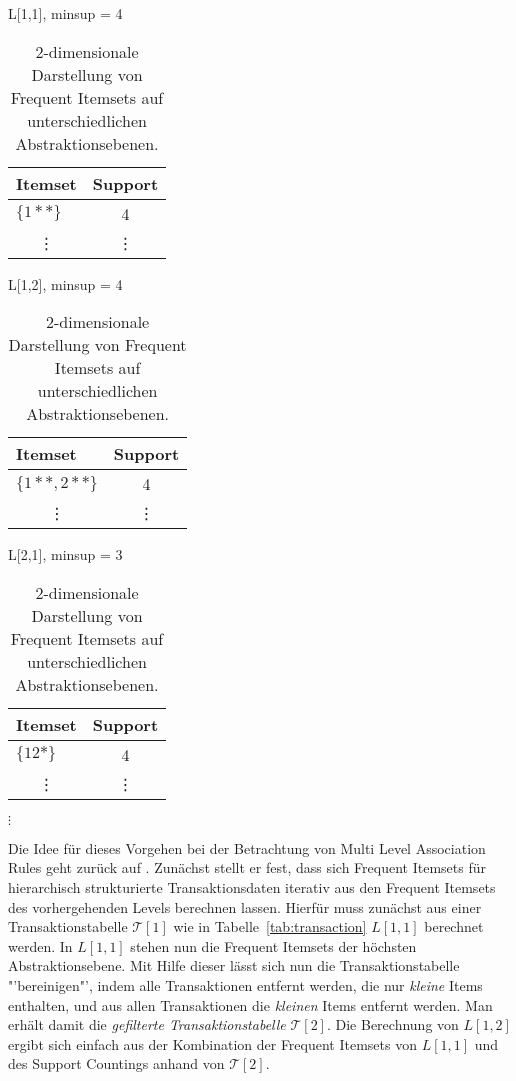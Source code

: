 \begin{table}[tbh]
	\caption{2-dimensionale Darstellung von Frequent Itemsets auf 
	unterschiedlichen Abstraktionsebenen.}
	\label{tab:3}
	\parbox{.4\linewidth}{
		\centering
		L[1,1], minsup = 4
		\begin{tabular}{lc}
			\toprule
			\textbf{Itemset}& \textbf{Support}\\
			\midrule
			\(\{1**\}\)	& 4\\
			\multicolumn{1}{c}{\vdots}& \vdots\\
			\bottomrule
		\end{tabular}
	}
	\hfill
	\parbox{.4\linewidth}{
		\centering
		L[1,2], minsup = 4
		\begin{tabular}{lc}
			\toprule
			\textbf{Itemset}& \textbf{Support}\\
			\midrule
			\(\{1**, 2**\}\)& 4\\
			\multicolumn{1}{c}{\vdots}& \vdots\\
			\bottomrule
		\end{tabular}
	}

	\vskip 15pt

	\parbox{.4\linewidth}{
		\centering
		L[2,1], minsup = 3
		\begin{tabular}{lc}
			\toprule
			\textbf{Itemset}& \textbf{Support}\\
			\midrule
			\(\{12*\}\)& 4\\
			\multicolumn{1}{c}{\vdots}& \vdots\\
			\bottomrule
		\end{tabular}
	}
	\hfill
	\parbox{.4\linewidth}{
		\centering
		\(\vdots\)
	}
\end{table}

Die Idee für dieses Vorgehen bei der Betrachtung von Multi Level Association Rules
geht zurück auf \citet{Han95}. Zunächst stellt er fest, dass sich Frequent Itemsets
für hierarchisch strukturierte Transaktionsdaten iterativ aus den Frequent Itemsets
des vorhergehenden Levels berechnen lassen. Hierfür muss zunächst aus einer 
Transaktionstabelle \(\mathcal{T}[1]\) wie in 
Tabelle~\ref{tab:transaction} \(L[1,1]\) berechnet werden.
In \(L[1,1]\) stehen nun die Frequent Itemsets der höchsten Abstraktionsebene. Mit
Hilfe dieser lässt sich nun die Transaktionstabelle "'bereinigen"', indem alle
Transaktionen entfernt werden, die nur \textit{kleine} Items enthalten, und aus
allen Transaktionen die \textit{kleinen} Items entfernt werden. Man erhält damit
die \textit{gefilterte Transaktionstabelle} \(\mathcal{T}[2]\). Die Berechnung von
\(L[1,2]\) ergibt sich einfach aus der Kombination der Frequent Itemsets von 
\(L[1,1]\) und des Support Countings anhand von \(\mathcal{T}[2]\).

